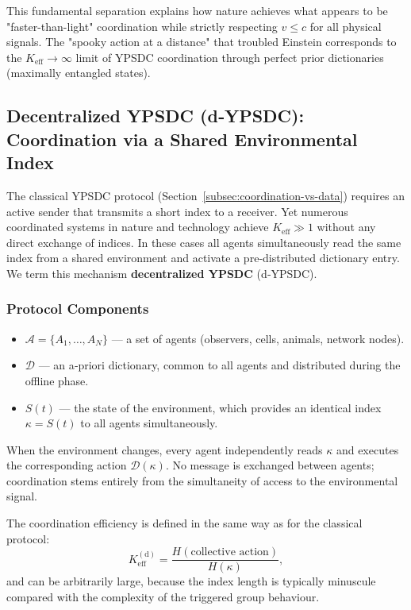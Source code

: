 \documentclass[11pt,a4paper]{article}
\begin{document}
	This fundamental separation explains how nature achieves what appears to be "faster-than-light" coordination while strictly respecting $v \leq c$ for all physical signals. The "spooky action at a distance" that troubled Einstein corresponds to the $K_{\mathrm{eff}} \to \infty$ limit of YPSDC coordination through perfect prior dictionaries (maximally entangled states).
	
	\subsection{Decentralized YPSDC (d‑YPSDC): Coordination via a Shared Environmental Index}
	\label{subsec:d-ypsdc}
	
	The classical YPSDC protocol (Section~\ref{subsec:coordination-vs-data}) requires an active sender
	that transmits a short index to a receiver. Yet numerous coordinated systems in nature and technology
	achieve $K_{\mathrm{eff}} \gg 1$ without any direct exchange of indices. In these cases all agents
	simultaneously read the same index from a shared environment and activate a pre‑distributed dictionary
	entry. We term this mechanism \textbf{decentralized YPSDC} (d‑YPSDC).
	
	\subsubsection*{Protocol Components}
	\begin{itemize}[leftmargin=*]
		\item $\mathcal{A} = \{A_1,\dots,A_N\}$ — a set of agents (observers, cells, animals, network nodes).
		\item $\mathcal{D}$ — an a‑priori dictionary, common to all agents and distributed during the offline phase.
		\item $S(t)$ — the state of the environment, which provides an identical index $\kappa = S(t)$ to all agents
		simultaneously.
	\end{itemize}
	When the environment changes, every agent independently reads $\kappa$ and executes the corresponding
	action $\mathcal{D}(\kappa)$. No message is exchanged between agents; coordination stems entirely from the
	simultaneity of access to the environmental signal.
	
	The coordination efficiency is defined in the same way as for the classical protocol:
	\[
	K_{\mathrm{eff}}^{\mathrm{(d)}} = \frac{H(\text{collective action})}{H(\kappa)},
	\]
	and can be arbitrarily large, because the index length is typically minuscule compared with the complexity of
	the triggered group behaviour.
	
\end{document}
